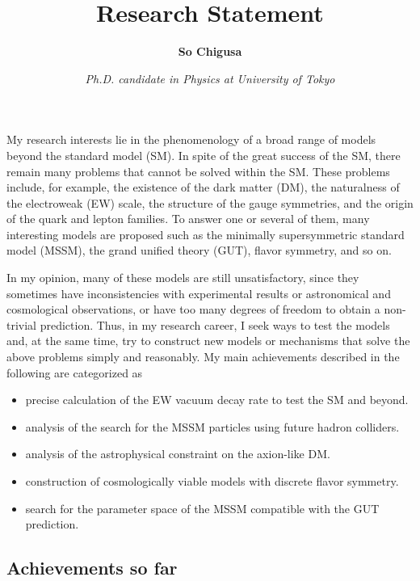 \documentclass[12pt,notitlepage]{article}
\title{\vspace*{-3cm}Research Statement}
\author{\textbf{So Chigusa}}
\date{\vspace*{-4mm}\textit{Ph.D. candidate in Physics at University of Tokyo}}
\begin{document}
\maketitle

My research interests lie in the phenomenology of a broad range of models beyond the standard model (SM).
In spite of the great success of the SM, there remain many problems that cannot be solved within the SM.
These problems include, for example, the existence of the dark matter (DM), the naturalness of the electroweak (EW) scale, the structure of the gauge symmetries, and the origin of the quark and lepton families.
To answer one or several of them, many interesting models are proposed such as the minimally supersymmetric standard model (MSSM), the grand unified theory (GUT), flavor symmetry, and so on.

In my opinion, many of these models are still unsatisfactory, since they sometimes have inconsistencies with experimental results or astronomical and cosmological observations, or have too many degrees of freedom to obtain a non-trivial prediction.
Thus, in my research career, I seek ways to test the models and, at the same time, try to construct new models or mechanisms that solve the above problems simply and reasonably.
My main achievements described in the following are categorized as
\vspace{-1.3mm}
\begin{itemize}
  \setlength{\parskip}{0mm}
  \setlength{\itemsep}{1mm}
  \item precise calculation of the EW vacuum decay rate to test the SM and beyond.
  \item analysis of the search for the MSSM particles using future hadron colliders.
  \item analysis of the astrophysical constraint on the axion-like DM.
  \item construction of cosmologically viable models with discrete flavor symmetry.
  \item search for the parameter space of the MSSM compatible with the GUT prediction.
\end{itemize}

\vspace*{-2mm}
\subsection*{Achievements so far}
\end{document}
